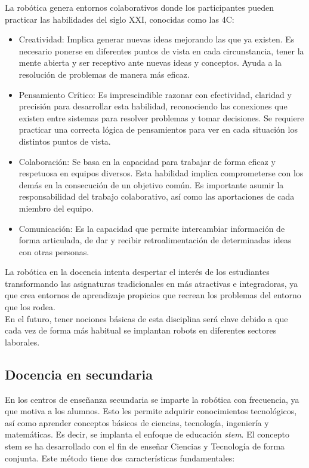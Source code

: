 La robótica genera entornos colaborativos donde los participantes pueden practicar las habilidades del siglo XXI, conocidas como las 4C:

\begin{itemize}
\item Creatividad: Implica generar nuevas ideas mejorando las que ya existen. Es necesario ponerse en diferentes puntos de vista en cada circunstancia, tener la mente abierta y ser receptivo ante nuevas ideas y conceptos. Ayuda a la resolución de problemas de manera más eficaz.
\item Pensamiento Crítico: Es imprescindible razonar con efectividad, claridad y precisión para desarrollar esta habilidad, reconociendo las conexiones que existen entre sistemas para resolver problemas y tomar decisiones. Se requiere practicar una correcta lógica de pensamientos para ver en cada situación los distintos puntos de vista.
\item Colaboración: Se basa en la capacidad para trabajar de forma eficaz y respetuosa en equipos diversos. Esta habilidad implica comprometerse con los demás en la consecución de un objetivo común. Es importante asumir la responsabilidad del trabajo colaborativo, así como las aportaciones de cada miembro del equipo.
\item Comunicación: Es la capacidad que permite intercambiar información de forma articulada, de dar y recibir retroalimentación de determinadas ideas con otras personas.
\end{itemize}

La robótica en la docencia intenta despertar el interés de los estudiantes transformando las asignaturas tradicionales en más atractivas e integradoras, ya que crea entornos de aprendizaje propicios que recrean los problemas del entorno que los rodea.\\

En el futuro, tener nociones básicas de esta disciplina será clave debido a que cada vez de forma más habitual se implantan robots en diferentes sectores laborales.

\subsection{Docencia en secundaria}

En los centros de enseñanza secundaria se imparte la robótica con frecuencia, ya que motiva a los alumnos. Esto les permite adquirir conocimientos tecnológicos, así como aprender conceptos básicos de ciencias, tecnología, ingeniería y matemáticas. Es decir, se implanta el enfoque de educación \textit{\acrfull{stem}}. El concepto \acrshort{stem} se ha desarrollado con el fin de enseñar Ciencias y Tecnología de forma conjunta. Este método tiene dos características fundamentales:

